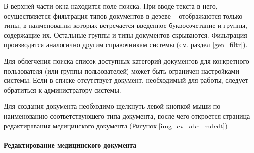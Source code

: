 В верхней части окна находится поле поиска. При вводе текста в него, осуществляется фильтрация типов документов в дереве -- отображаются только типы, в наименовании которых встречается введенное буквосочетание и группы, содержащие их. Остальные  группы и типы документов скрываются. Фильтрация производится аналогично другим справочникам системы (см. раздел \ref{gen_filtr}). 



\begin{prim}
 Для облегчения поиска список доступных категорий документов для конкретного пользователя (или группы пользователей) может быть ограничен настройками системы. Если в списке отсутствует документ, необходимый для работы, следует обратиться к администратору системы.
\end{prim} 

Для создания документа необходимо щелкнуть левой кнопкой мыши по наименованию соответствующего типа документа, после чего откроется страница редактирования медицинского документа (Рисунок \ref{img_ev_obr_mdedt}). 

\paragraph{Редактирование медицинского документа} \label{ev_obr_mdedt}


